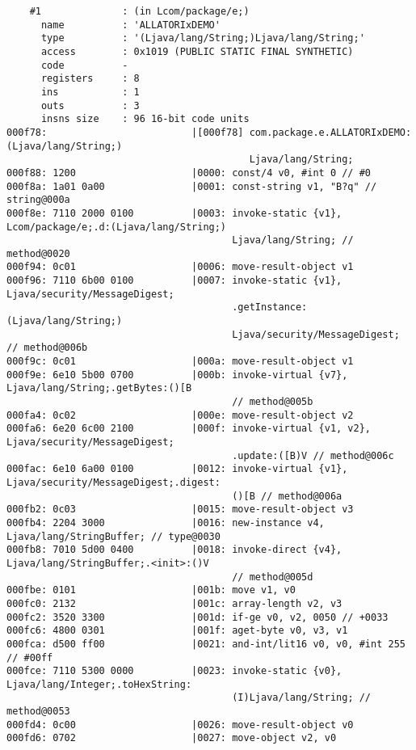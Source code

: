 \begin{lstlisting}
    #1              : (in Lcom/package/e;)
      name          : 'ALLATORIxDEMO'
      type          : '(Ljava/lang/String;)Ljava/lang/String;'
      access        : 0x1019 (PUBLIC STATIC FINAL SYNTHETIC)
      code          -
      registers     : 8
      ins           : 1
      outs          : 3
      insns size    : 96 16-bit code units
000f78:                         |[000f78] com.package.e.ALLATORIxDEMO:(Ljava/lang/String;)
                                          Ljava/lang/String;
000f88: 1200                    |0000: const/4 v0, #int 0 // #0
000f8a: 1a01 0a00               |0001: const-string v1, "B?q" // string@000a
000f8e: 7110 2000 0100          |0003: invoke-static {v1}, Lcom/package/e;.d:(Ljava/lang/String;)
                                       Ljava/lang/String; // method@0020
000f94: 0c01                    |0006: move-result-object v1
000f96: 7110 6b00 0100          |0007: invoke-static {v1}, Ljava/security/MessageDigest;
                                       .getInstance:(Ljava/lang/String;)
                                       Ljava/security/MessageDigest; // method@006b
000f9c: 0c01                    |000a: move-result-object v1
000f9e: 6e10 5b00 0700          |000b: invoke-virtual {v7}, Ljava/lang/String;.getBytes:()[B
                                       // method@005b
000fa4: 0c02                    |000e: move-result-object v2
000fa6: 6e20 6c00 2100          |000f: invoke-virtual {v1, v2}, Ljava/security/MessageDigest;
                                       .update:([B)V // method@006c
000fac: 6e10 6a00 0100          |0012: invoke-virtual {v1}, Ljava/security/MessageDigest;.digest:
                                       ()[B // method@006a
000fb2: 0c03                    |0015: move-result-object v3
000fb4: 2204 3000               |0016: new-instance v4, Ljava/lang/StringBuffer; // type@0030
000fb8: 7010 5d00 0400          |0018: invoke-direct {v4}, Ljava/lang/StringBuffer;.<init>:()V
                                       // method@005d
000fbe: 0101                    |001b: move v1, v0
000fc0: 2132                    |001c: array-length v2, v3
000fc2: 3520 3300               |001d: if-ge v0, v2, 0050 // +0033
000fc6: 4800 0301               |001f: aget-byte v0, v3, v1
000fca: d500 ff00               |0021: and-int/lit16 v0, v0, #int 255 // #00ff
000fce: 7110 5300 0000          |0023: invoke-static {v0}, Ljava/lang/Integer;.toHexString:
                                       (I)Ljava/lang/String; // method@0053
000fd4: 0c00                    |0026: move-result-object v0
000fd6: 0702                    |0027: move-object v2, v0

\end{lstlisting}
